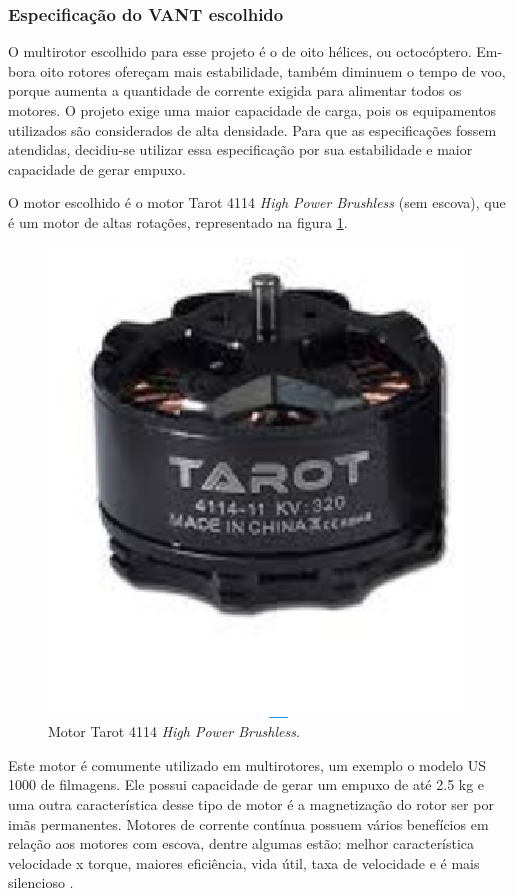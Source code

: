 \subsubsection{Especificação do VANT escolhido}

O multirotor escolhido para esse projeto é o de oito hélices, ou octocóptero. Em- bora oito rotores ofereçam mais estabilidade, também diminuem 
o tempo de voo, porque aumenta a quantidade de corrente exigida para alimentar todos os motores.  O projeto exige uma maior capacidade de carga, pois os equipamentos utilizados são considerados de alta densidade. Para que as especificações fossem atendidas, decidiu-se utilizar essa especificação por sua estabilidade e maior capacidade de gerar empuxo.

O motor escolhido é o motor Tarot 4114 \textit{High Power Brushless} (sem escova), que é um motor de altas rotações, representado na figura 
\ref{fig:tarot2}.

\begin{figure}[H]
    \centering
      \includegraphics[keepaspectratio=true,scale=0.5]{figuras/tarot2.eps}
    \caption{Motor Tarot 4114 \textit{High Power Brushless}. \cite{tarot}}
    \label{fig:tarot2}
\end{figure}
\vfill
Este motor é comumente utilizado em  multirotores, um exemplo o modelo US 1000 de filmagens. Ele possui capacidade de gerar um empuxo de até
2.5 kg e uma outra característica desse tipo de motor é a magnetização do rotor ser por imãs permanentes. Motores de corrente contínua 
possuem vários benefícios em relação aos motores com escova, dentre algumas estão: melhor característica velocidade x torque, maiores
eficiência, vida útil, taxa de velocidade e é mais silencioso \cite{nascimento}.


